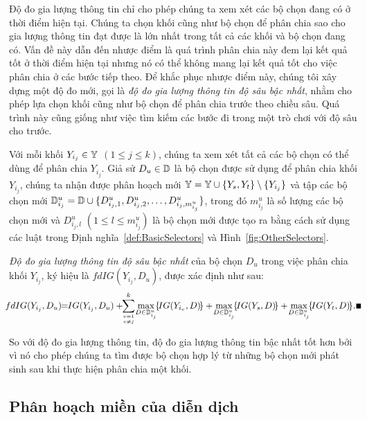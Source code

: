 Độ đo gia lượng thông tin chỉ cho phép chúng ta xem xét các bộ chọn đang có ở thời điểm hiện tại. Chúng ta chọn khối cũng như bộ chọn để phân chia sao cho gia lượng thông tin đạt được là lớn nhất trong tất cả các khối và bộ chọn đang có. Vấn đề này dẫn đến nhược điểm là quá trình phân chia này đem lại kết quả tốt ở thời điểm hiện tại nhưng nó có thể không mang lại kết quả tốt cho việc phân chia ở các bước tiếp theo. Để khắc phục nhược điểm này, chúng tôi xây dựng một độ đo mới, gọi là {\em độ đo gia lượng thông tin độ sâu bậc nhất}, nhằm cho phép lựa chọn khối cũng như bộ chọn để phân chia trước theo chiều sâu. Quá trình này cũng giống như việc tìm kiếm các bước đi trong một trò chơi với độ sâu cho trước.

Với mỗi khối $Y_{i_j} \in \mathbb{Y}$ $(1 \leq j \leq k)$, chúng ta xem xét tất cả các bộ chọn có thể dùng để phân chia $Y_{i_j}$. Giả sử $D_{u} \in \mathbb{D}$ là bộ chọn được sử dụng để phân chia khối $Y_{i_j}$, chúng ta nhận được phân hoạch mới $\mathbb{Y} = \mathbb{Y} \cup \{Y_s, Y_t\} \setminus \{Y_{i_j}\}$ và tập các bộ chọn mới $\mathbb{D}^u_{i_j} = \mathbb{D} \cup \{D^u_{{i_j},1}, D^u_{{i_j},2}, \ldots, D^u_{{i_j},m^u_{i_j}}\}$, trong đó $m^u_{i_j}$ là số lượng các bộ chọn mới và $D^u_{{i_j},l}$ $(1 \leq l \leq m^u_{i_j})$ là bộ chọn mới được tạo ra bằng cách sử dụng các luật trong Định nghĩa~\ref{def:BasicSelectors} và Hình~\ref{fig:OtherSelectors}.

\begin{Definition}
	{\em Độ đo gia lượng thông tin độ sâu bậc nhất} của bộ chọn $D_u$ trong việc phân chia khối $Y_{i_j}$, ký hiệu là $fdIG(Y_{i_j}, D_u)$, được xác định như sau:
	{\small
		\begin{equation}
		\!\!\!fdIG(Y_{i_j}, D_u)\!\!=\!\!IG(Y_{i_j}, D_u)+\!
		\!\sum\limits_{v=1\atop v \not= j}^{k}\!\max\limits_{D \in \mbD^u_{i_j}}\!\{\!IG(Y_{i_v},D)\!\}
		+\!\max\limits_{D \in \mbD^u_{i_j}}\!\{\!IG(Y_{s}, D)\!\}+\!\max\limits_{D \in \mbD^u_{i_j}}\!\{\!IG(Y_{t}, D)\!\}.\,\myend\!\!\!
		\end{equation}
	}
	\label{eq:fdIG}
\end{Definition}
\vspace{-4.0ex}

So với độ đo gia lượng thông tin, độ đo gia lượng thông tin bậc nhất tốt hơn bởi vì nó cho phép chúng ta tìm được bộ chọn hợp lý từ những bộ chọn mới phát sinh sau khi thực hiện phân chia một khối.

\subsection{Phân hoạch miền của diễn dịch}

